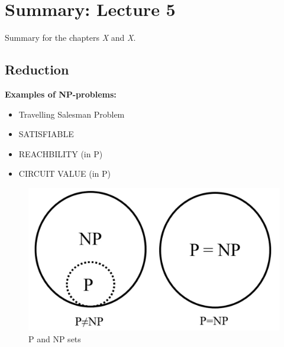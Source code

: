 \documentclass[a4]{scrartcl}
\begin{document}
\section*{Summary: Lecture 5}

Summary for the chapters \textit{X} and \textit{X}. \cite{book}










\subsection*{Reduction}


\begin{minipage}{0.56\textwidth}
\textbf{Examples of NP-problems:}
\begin{itemize}
\item Travelling Salesman Problem
\item SATISFIABLE
\item REACHBILITY (in P)
\item CIRCUIT VALUE (in P)
\end{itemize}

\end{minipage}\begin{minipage}{0.4\textwidth}

\begin{figure}[H]
\includegraphics[scale=0.2]{PNP.jpg}
\caption{P and NP sets \cite{PNPsets}}
\end{figure}

\end{minipage}
\end{document}
